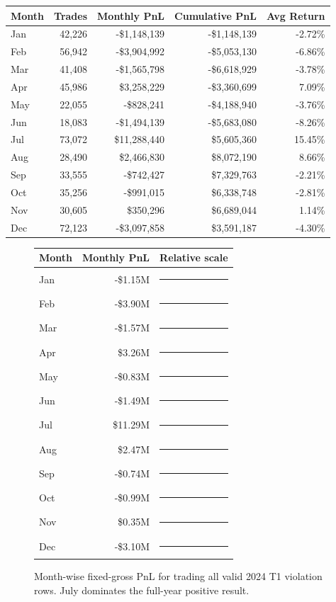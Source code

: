 \documentclass[11pt]{article}
\begin{document}
\begin{center}
\begin{tabular}{@{}lrrrr@{}}
\toprule
Month & Trades & Monthly PnL & Cumulative PnL & Avg Return \\
\midrule
Jan & 42,226 & -\$1,148,139 & -\$1,148,139 & -2.72\% \\
Feb & 56,942 & -\$3,904,992 & -\$5,053,130 & -6.86\% \\
Mar & 41,408 & -\$1,565,798 & -\$6,618,929 & -3.78\% \\
Apr & 45,986 & \$3,258,229 & -\$3,360,699 & 7.09\% \\
May & 22,055 & -\$828,241 & -\$4,188,940 & -3.76\% \\
Jun & 18,083 & -\$1,494,139 & -\$5,683,080 & -8.26\% \\
Jul & 73,072 & \$11,288,440 & \$5,605,360 & 15.45\% \\
Aug & 28,490 & \$2,466,830 & \$8,072,190 & 8.66\% \\
Sep & 33,555 & -\$742,427 & \$7,329,763 & -2.21\% \\
Oct & 35,256 & -\$991,015 & \$6,338,748 & -2.81\% \\
Nov & 30,605 & \$350,296 & \$6,689,044 & 1.14\% \\
Dec & 72,123 & -\$3,097,858 & \$3,591,187 & -4.30\% \\
\bottomrule
\end{tabular}
\end{center}

\begin{figure}[h]
\centering
\begin{tabular}{@{}lrl@{}}
\toprule
Month & Monthly PnL & Relative scale \\
\midrule
Jan & -\$1.15M & \textcolor{red}{\rule{1.0cm}{7pt}}\\
Feb & -\$3.90M & \textcolor{red}{\rule{3.5cm}{7pt}}\\
Mar & -\$1.57M & \textcolor{red}{\rule{1.4cm}{7pt}}\\
Apr & \$3.26M & \textcolor{green!50!black}{\rule{2.9cm}{7pt}}\\
May & -\$0.83M & \textcolor{red}{\rule{0.7cm}{7pt}}\\
Jun & -\$1.49M & \textcolor{red}{\rule{1.3cm}{7pt}}\\
Jul & \$11.29M & \textcolor{green!50!black}{\rule{10.0cm}{7pt}}\\
Aug & \$2.47M & \textcolor{green!50!black}{\rule{2.2cm}{7pt}}\\
Sep & -\$0.74M & \textcolor{red}{\rule{0.7cm}{7pt}}\\
Oct & -\$0.99M & \textcolor{red}{\rule{0.9cm}{7pt}}\\
Nov & \$0.35M & \textcolor{green!50!black}{\rule{0.3cm}{7pt}}\\
Dec & -\$3.10M & \textcolor{red}{\rule{2.7cm}{7pt}}\\
\bottomrule
\end{tabular}
\caption{Month-wise fixed-gross PnL for trading all valid 2024 T1 violation rows. July dominates the full-year positive result.}
\end{figure}
\end{document}
